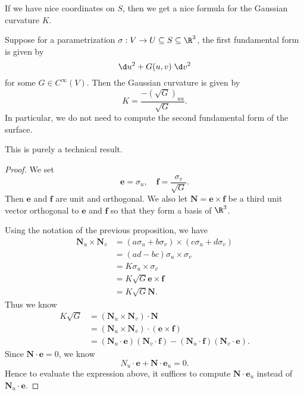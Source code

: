 \documentclass[a4paper]{article}
\begin{document}
If we have nice coordinates on $S$, then we get a nice formula for the Gaussian curvature $K$.
\begin{thm}
  Suppose for a parametrization $\sigma: V \to U \subseteq S \subseteq \R^3$, the first fundamental form is given by
  \[
    \d u^2 + G (u, v) \;\d v^2
  \]
  for some $G \in C^{\infty}(V)$. Then the Gaussian curvature is given by
  \[
    K = \frac{-(\sqrt{G})_{uu}}{\sqrt{G}}.
  \]
  In particular, we do not need to compute the second fundamental form of the surface.
\end{thm}
This is purely a technical result.
\begin{proof}
  We set
  \[
    \mathbf{e} = \sigma_u,\quad \mathbf{f} = \frac{\sigma_v}{\sqrt{G}}.
  \]
  Then $\mathbf{e}$ and $\mathbf{f}$ are unit and orthogonal. We also let $\mathbf{N} = \mathbf{e} \times \mathbf{f}$ be a third unit vector orthogonal to $\mathbf{e}$ and $\mathbf{f}$ so that they form a basis of $\R^3$.

  Using the notation of the previous proposition, we have
  \begin{align*}
    \mathbf{N}_u \times \mathbf{N}_v &= (a \sigma_u + b \sigma_v)\times (c \sigma_u + d \sigma_v) \\
    &= (ad - bc) \sigma_u \times \sigma_v \\
    &= K \sigma_u \times \sigma_v\\
    &= K \sqrt{G} \mathbf{e} \times \mathbf{f}\\
    &= K \sqrt{G} \mathbf{N}.
  \end{align*}
  Thus we know
  \begin{align*}
    K \sqrt{G} &= (\mathbf{N}_u \times \mathbf{N}_v) \cdot \mathbf{N} \\
    &= (\mathbf{N}_u \times \mathbf{N}_v) \cdot (\mathbf{e}\times \mathbf{f})\\
    &= (\mathbf{N}_u \cdot \mathbf{e})(\mathbf{N}_v \cdot \mathbf{f}) - (\mathbf{N}_u \cdot \mathbf{f}) (\mathbf{N}_v \cdot \mathbf{e}).
  \end{align*}
  Since $\mathbf{N}\cdot \mathbf{e} = 0$, we know
  \[
    N_u \cdot \mathbf{e} + \mathbf{N}\cdot \mathbf{e}_u = 0.
  \]
  Hence to evaluate the expression above, it suffices to compute $\mathbf{N}\cdot \mathbf{e}_u$ instead of $\mathbf{N}_u \cdot \mathbf{e}$.


\end{proof}
\end{document}
